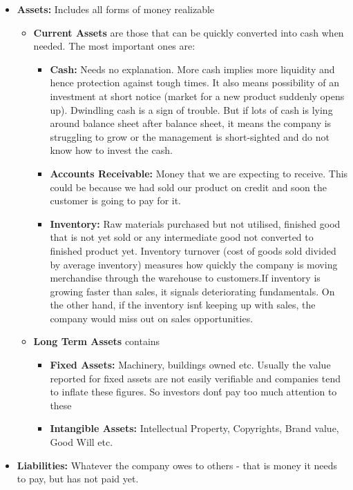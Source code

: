\begin{itemize}
\item \textbf{Assets:} Includes all forms of money realizable 
	\begin{itemize}
	\item \textbf{Current Assets} are those that can be quickly converted into cash when needed. The most important ones are:
		\begin{itemize}
		\item \textbf{Cash:} Needs no explanation. More cash implies more liquidity and hence protection against tough times. It also means possibility of an investment at short notice (market for a new product suddenly opens up). Dwindling cash is a sign of trouble. But if lots of cash is lying around balance sheet after balance sheet, it means the company is struggling to grow or the management is short-sighted and do not know how to invest the cash.
		\item \textbf{Accounts Receivable:} Money that we are expecting to receive. This could be because we had sold our product on credit and soon the customer is going to pay for it. 
		\item \textbf{Inventory:} Raw materials purchased but not utilised, finished good that is not yet sold or any intermediate good not converted to finished product yet. Inventory turnover (cost of goods sold divided by average inventory) measures how quickly the company is moving merchandise through the warehouse to customers.If inventory is growing faster than sales, it signals deteriorating fundamentals. On the other hand, if the inventory isn\'t keeping up with sales, the company would miss out on sales opportunities. 
		\end{itemize}
	\item \textbf{Long Term Assets} contains
		\begin{itemize}
		\item \textbf{Fixed Assets:} Machinery, buildings owned etc. Usually the value reported for fixed assets are not easily verifiable and companies tend to inflate these figures. So investors don\'t pay too much attention to these
		\item \textbf{Intangible Assets:} Intellectual Property, Copyrights, Brand value, Good Will etc. 
		\end{itemize}
	\end{itemize}
\item \textbf{Liabilities:} Whatever the company owes to others - that is money it needs to pay, but has not paid yet. 
	\begin{itemize}

\end{itemize}
\end{itemize}
